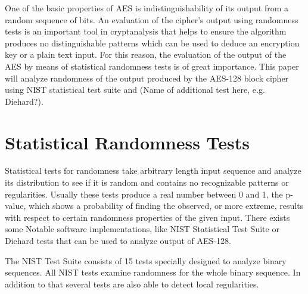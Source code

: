 \documentclass[conference]{IEEEtran}
\begin{document}
One of the basic properties of AES is indistinguishability of its output from a random sequence of bits. An evaluation of the cipher's output using randomness tests is an important tool in cryptanalysis that helps to ensure the algorithm produces no distinguishable patterns which can be used to deduce an encryption key or a plain text input. For this reason, the evaluation of the output of the AES by means of statistical randomness tests is of great importance. This paper will analyze randomness of the output produced by the AES-128 block cipher using NIST statistical test suite and (Name of additional test here, e.g. Diehard?).  

\section{Statistical Randomness Tests}

Statistical tests for randomness take arbitrary length input sequence and analyze its distribution to see if it is random and contains no recognizable patterns or regularities. Usually these tests produce a real number between 0 and 1, the p-value, which shows a probability of finding the observed, or more extreme, results with respect to certain randomness properties of the given input. There exists some Notable software implementations, like NIST Statistical Test Suite or Diehard tests that can be used to analyze output of AES-128. 

The NIST Test Suite consists of 15 tests specially designed to analyze
binary sequences. All NIST tests examine randomness for the whole binary sequence. In addition to that several tests are also able to detect local regularities. 

\end{document}
